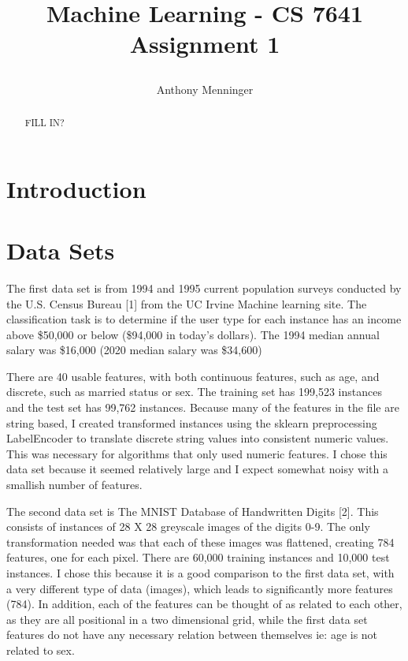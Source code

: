 \documentclass[letterpaper]{article} %
\title{
Machine Learning - CS 7641
Assignment 1
	
}
\author {
    Anthony Menninger \\
}
\begin{document}
\maketitle

\begin{abstract}
FILL IN?
\end{abstract}

\section{Introduction}


\section{Data Sets}

The first data set is from 1994 and 1995 current population surveys conducted by the U.S. Census Bureau [1] from the UC Irvine Machine learning site.  The classification task is to determine if the user type for each instance has an income above \$50,000 or below (\$94,000 in today's dollars).  The 1994 median annual salary was \$16,000 (2020 median salary was \$34,600) 

There are 40 usable features, with both continuous features, such as age, and discrete, such as married status or sex.  The training set has 199,523 instances and the test set has 99,762 instances.  Because many of the features in the file are string based, I created transformed instances using the sklearn preprocessing LabelEncoder to translate discrete string values into consistent numeric values.  This was necessary for algorithms that only used numeric features. I chose this data set because it seemed relatively large and I expect somewhat noisy with a smallish number of features.  

The second data set is The MNIST Database of Handwritten Digits [2].  This consists of instances of 28 X 28 greyscale images of the digits 0-9.  The only transformation needed was that each of these images was flattened, creating 784 features, one for each pixel.  There are 60,000 training instances and 10,000 test instances.  I chose this because it is a good comparison to the first data set, with a very different type of data (images), which leads to significantly more features (784).  In addition, each of the features can be thought of as related to each other, as they are all positional in a two dimensional grid, while the first data set features do not have any necessary relation between themselves ie:  age is not related to sex.  
\end{document}
